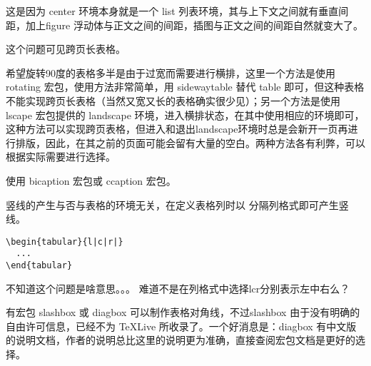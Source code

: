 这是因为 center 环境本身就是一个 list
列表环境，其与上下文之间就有垂直间距，加上figure
浮动体与正文之间的间距，插图与正文之间的间距自然就变大了。



这个问题可见跨页长表格。



希望旋转90度的表格多半是由于过宽而需要进行横排，这里一个方法是使用
rotating 宏包，使用方法非常简单，用 sidewaytable 替代 table
即可，但这种表格不能实现跨页长表格（当然又宽又长的表格确实很少见）；另一个方法是使用lscape
宏包提供的 landscape
环境，进入横排状态，在其中使用相应的环境即可，这种方法可以实现跨页表格，但进入和退出landscape环境时总是会新开一页再进行排版，因此，在其之前的页面可能会留有大量的空白。两种方法各有利弊，可以根据实际需要进行选择。






使用 bicaption 宏包或 ccaption 宏包。



竖线的产生与否与表格的环境无关，在定义表格列时以 \textbar{}
分隔列格式即可产生竖线。
\begin{verbatim}
\begin{tabular}{l|c|r|}
  ...
\end{tabular}
\end{verbatim}







不知道这个问题是啥意思。。。
难道不是在列格式中选择lcr分别表示左中右么？


有宏包 slashbox 或 diagbox 可以制作表格对角线，不过slashbox
由于没有明确的自由许可信息，已经不为 TeXLive
所收录了。一个好消息是：diagbox
有中文版的说明文档，作者的说明总比这里的说明更为准确，直接查阅宏包文档是更好的选择。
